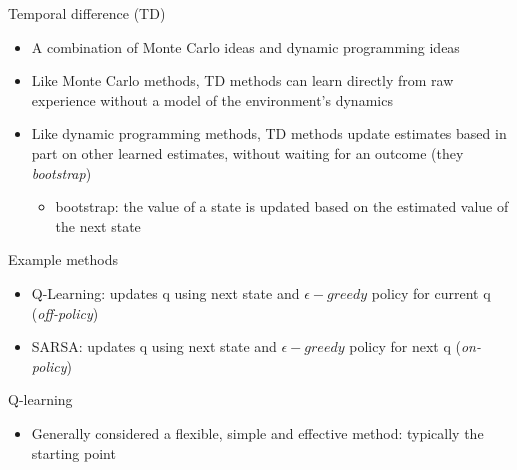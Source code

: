 \documentclass[presentation, 9pt]{beamer}\mode<presentation>{\usetheme{AMSBolognaFC}}
\begin{document}
\begin{frame}{Temporal difference (TD)}
	\begin{itemize}
		\item A combination of Monte Carlo ideas and dynamic programming ideas
		\item Like Monte Carlo methods, TD methods can learn directly from raw experience without a model of the environment's dynamics
		\item Like dynamic programming methods, TD methods update estimates based in part on other learned estimates, without waiting for an outcome (they \emph{bootstrap})
		\begin{itemize}
			\item bootstrap: the value of a state is updated based on the estimated value of the next state
		\end{itemize}
	\end{itemize}
	\begin{exampleblock}{Example methods}
		\begin{itemize}
			\item Q-Learning: updates q using next state and $\epsilon-greedy$ policy for current q (\emph{off-policy})
			\item SARSA: updates q using next state and $\epsilon-greedy$ policy for next q (\emph{on-policy})
		\end{itemize}
	\end{exampleblock}
	\begin{alertblock}{Q-learning}
		\begin{itemize}
			\item Generally considered a flexible, simple and effective method: typically the starting point
		\end{itemize}
	\end{alertblock}
\end{frame}
\end{document}
